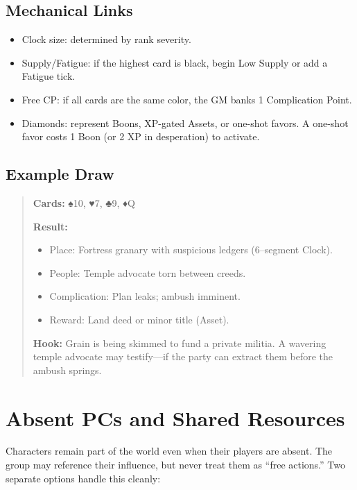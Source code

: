 \documentclass[12pt]{article}
\begin{document}
\subsection{Mechanical Links}
\begin{itemize}
  \item Clock size: determined by rank severity.
  \item Supply/Fatigue: if the highest card is black, begin Low Supply or add a Fatigue tick.
  \item Free CP: if all cards are the same color, the GM banks 1 Complication Point.
  \item Diamonds: represent Boons, XP-gated Assets, or one-shot favors. A one-shot favor costs 1 Boon (or 2 XP in desperation) to activate.
\end{itemize}

\subsection{Example Draw}
\begin{quote}
\textbf{Cards:} ♠10, ♥7, ♣9, ♦Q

\textbf{Result:}
\begin{itemize}
  \item Place: Fortress granary with suspicious ledgers (6--segment Clock).
  \item People: Temple advocate torn between creeds.
  \item Complication: Plan leaks; ambush imminent.
  \item Reward: Land deed or minor title (Asset).
\end{itemize}
\textbf{Hook:} Grain is being skimmed to fund a private militia. A wavering temple advocate may testify—if the party can extract them before the ambush springs.
\end{quote}

\section{Absent PCs and Shared Resources}

Characters remain part of the world even when their players are absent. The group may reference their influence, but never treat them as “free actions.” Two separate options handle this cleanly:
\end{document}
